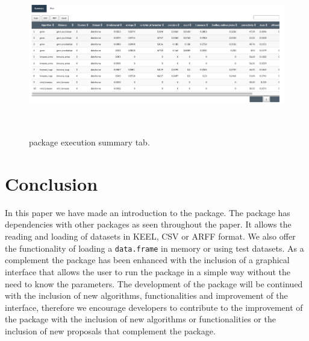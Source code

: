 \begin{enumerate}
\begin{itemize}
  \begin{figure}[]
    \centering
     \includegraphics[width=14cm, height=7cm]{img/tab_summary}
      \caption{ package execution summary tab.}
      \label{fig:tab_summary}
  \end{figure}

  \end{itemize}

\end{enumerate}
\newpage
\section{Conclusion}

In this paper we have made an introduction to the  package. The package has dependencies with other packages as seen throughout the paper. It allows the reading and loading of datasets in KEEL, CSV or ARFF format. We also offer the functionality of loading a \texttt{data.frame} in memory or using test datasets. As a complement the package has been enhanced with the inclusion of a graphical interface that allows the user to run the package in a simple way without the need to know the parameters. The development of the package will be continued with the inclusion of new algorithms, functionalities and improvement of the interface, therefore we encourage developers to contribute to the improvement of the package with the inclusion of new algorithms or functionalities or the inclusion of new proposals that complement the package.



\address{Luis Alfonso Pérez Martos\\
  Computer Department\\
  University of Jaén\\
  Spain\\
  (ORCiD if desired)\\
  }

